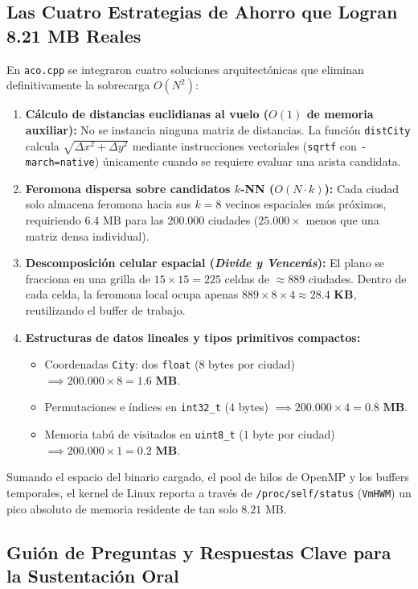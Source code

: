 \documentclass[11pt,a4paper]{article}
\begin{document}
\subsection{Las Cuatro Estrategias de Ahorro que Logran 8.21 MB Reales}
En \texttt{aco.cpp} se integraron cuatro soluciones arquitectónicas que eliminan definitivamente la sobrecarga $O(N^2)$:
\begin{enumerate}
    \item \textbf{Cálculo de distancias euclidianas al vuelo ($O(1)$ de memoria auxiliar):} No se instancia ninguna matriz de distancias. La función \texttt{distCity} calcula $\sqrt{\Delta x^2 + \Delta y^2}$ mediante instrucciones vectoriales (\texttt{sqrtf} con \texttt{-march=native}) únicamente cuando se requiere evaluar una arista candidata.
    \item \textbf{Feromona dispersa sobre candidatos $k$-NN ($O(N \cdot k)$):} Cada ciudad solo almacena feromona hacia sus $k=8$ vecinos espaciales más próximos, requiriendo $6.4\text{ MB}$ para las $200.000$ ciudades ($25.000\times$ menos que una matriz densa individual).
    \item \textbf{Descomposición celular espacial (\emph{Divide y Vencerás}):} El plano se fracciona en una grilla de $15 \times 15 = 225$ celdas de $\approx 889$ ciudades. Dentro de cada celda, la feromona local ocupa apenas $889 \times 8 \times 4 \approx \mathbf{28.4\text{ KB}}$, reutilizando el buffer de trabajo.
    \item \textbf{Estructuras de datos lineales y tipos primitivos compactos:}
    \begin{itemize}
        \item Coordenadas \texttt{City}: dos \texttt{float} ($8$ bytes por ciudad) $\implies 200.000 \times 8 = \mathbf{1.6\text{ MB}}$.
        \item Permutaciones e índices en \texttt{int32\_t} ($4$ bytes) $\implies 200.000 \times 4 = \mathbf{0.8\text{ MB}}$.
        \item Memoria tabú de visitados en \texttt{uint8\_t} ($1$ byte por ciudad) $\implies 200.000 \times 1 = \mathbf{0.2\text{ MB}}$.
    \end{itemize}
\end{enumerate}
Sumando el espacio del binario cargado, el pool de hilos de OpenMP y los buffers temporales, el kernel de Linux reporta a través de \texttt{/proc/self/status} (\texttt{VmHWM}) un pico absoluto de memoria residente de tan solo \textbf{$8.21\text{ MB}$}.

\subsection{Guión de Preguntas y Respuestas Clave para la Sustentación Oral}
\end{document}
